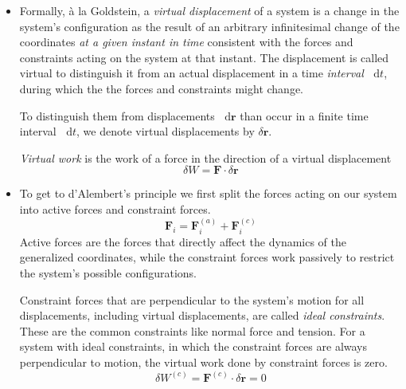 \documentclass[11pt, a4paper]{article}
\newcommand{\diff}{\mathop{}\!\mathrm{d}} %
\begin{document}
\begin{itemize}

	\item Formally, \`{a} la Goldstein, a \textit{virtual displacement} of a system is a change in the system's configuration as the result of an arbitrary infinitesimal change of the coordinates \textit{at a given instant in time} consistent with the forces and constraints acting on the system at that instant. The displacement is called virtual to distinguish it from an actual displacement in a time \textit{interval} $ \diff t $, during which the the forces and constraints might change.
	
	To distinguish them from displacements $ \diff \bm{r} $ than occur in a finite time interval $ \diff t $, we denote virtual displacements by $ \delta \bm{r} $.
	
	\textit{Virtual work} is the work of a force in the direction of a virtual displacement
	\begin{equation*}
		\delta W = \bm{F} \cdot \delta \bm{r}
	\end{equation*}

	\item To get to d'Alembert's principle we first split the forces acting on our system into active forces and constraint forces. 
	\begin{equation*}
		\bm{F}_{i} = \bm{F}_{i}^{(a)} + \bm{F}_{i}^{(c)}
	\end{equation*}
	Active forces are the forces that directly affect the dynamics of the generalized coordinates, while the constraint forces work passively to restrict the system's possible configurations.
		
	Constraint forces that are perpendicular to the system's motion for all displacements, including virtual displacements, are called \textit{ideal constraints}. These are the common constraints like normal force and tension. For a system with ideal constraints, in which the constraint forces are always perpendicular to motion, the virtual work done by constraint forces is zero.
	\begin{equation*}
		\delta W^{(c)} = \bm{F}^{(c)} \cdot \delta \bm{r} = 0
	\end{equation*}
	

\end{itemize}
\end{document}

